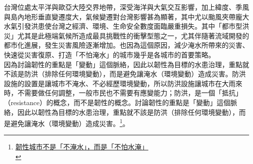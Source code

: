 \documentclass[a4paper,12pt]{article}
\begin{document}
台灣位處太平洋與歐亞大陸交界地帶，深受海洋與大氣交互影響，加上緯度、季風與島內地形垂直變遷度大，氣候變遷對台灣影響甚為顯著，其中尤以颱風夾帶龐大水氣引發洪患使台灣之經濟、環境、生命安全數度面臨嚴重損失。其中「都市型洪災」尤其是此極端氣候所造成最具挑戰性的衝擊型態之一，尤其伴隨著流域開發的都市化進展，發生災害風險逐漸增加。也因為這個原因，減少淹水所帶來的災害、快速從災害復原、打造「不怕淹水」的城市幾乎是各城市的首要策略。\\

因為討論韌性的重點是「變動」這個脈絡，因此以韌性為目標的水患治理，重點就不該是防洪（排除任何環境變動），而是避免讓淹水（環境變動）造成災害。防洪設施的設置是讓城市不淹水、不必經歷環境變動，所以防洪設施讓城市在大雨來時，不需要做任何調整，一般市民也不需要有應變能力；防洪，是一個「抵抗」（resistance）的概念，而不是韌性的概念。討論韌性的重點是「變動」這個脈絡，因此以韌性為目標的水患治理，重點就不該是防洪（排除任何環境變動），而是避免讓淹水（環境變動）造成災害。\footnote{\href{https://opinion.udn.com/opinion/story/8048/2501198}{韌性城市不是「不淹水」，而是「不怕水淹」}\\}。\\
\end{document}
